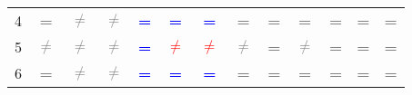 \begin{table}
\begin{center}
\begin{tabular}{ccccccccccccc}
\multicolumn{1}{c}{4}                                    & \textcolor{gray}{\textbf{=}}                        & \textcolor{gray}{\textbf{$\neq$}}  & \textcolor{gray}{\textbf{$\neq$}} & \textcolor{blue}{\textbf{=}} & \textcolor{blue}{\textbf{=}}             & \textcolor{blue}{\textbf{=}}          & \textcolor{gray}{\textbf{=}}          &\textcolor{gray}{\textbf{=}}         & \textcolor{gray}{\textbf{=}}          & \textcolor{gray}{\textbf{=}}          & \textcolor{gray}{\textbf{=}}         & \textcolor{gray}{\textbf{=}} \\ 
\multicolumn{1}{c}{5}                                    & \textcolor{gray}{\textbf{$\neq$}}               & \textcolor{gray}{\textbf{$\neq$}}  & \textcolor{gray}{\textbf{$\neq$}}  & \textcolor{blue}{\textbf{=}} & \textcolor{red}{\textbf{$\neq$}}    & \textcolor{red}{\textbf{$\neq$}} & \textcolor{gray}{\textbf{$\neq$}} & \textcolor{gray}{\textbf{=}}          & \textcolor{gray}{\textbf{$\neq$}} & \textcolor{gray}{\textbf{=}}          & \textcolor{gray}{\textbf{=}}         & \textcolor{gray}{\textbf{=}} \\ 
\multicolumn{1}{c}{6}                                    & \textcolor{gray}{\textbf{=}}                        & \textcolor{gray}{\textbf{$\neq$}}  & \textcolor{gray}{\textbf{$\neq$}}  & \textcolor{blue}{\textbf{=}}& \textcolor{blue}{\textbf{=}}            & \textcolor{blue}{\textbf{=}}          & \textcolor{gray}{\textbf{=}}          & \textcolor{gray}{\textbf{=}}          & \textcolor{gray}{\textbf{=}}         & \textcolor{gray}{\textbf{=}}          & \textcolor{gray}{\textbf{=}}         & \textcolor{gray}{\textbf{=}} \\ 
\bottomrule
\end{tabular}
\end{center}
\end{table}
